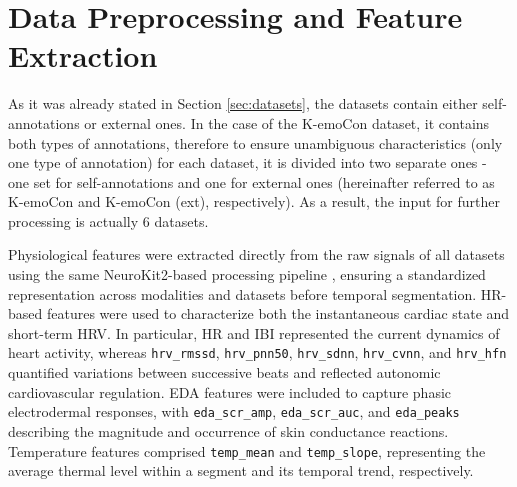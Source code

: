 \documentclass{isd}
\begin{document}
{%




\section{Data Preprocessing and Feature Extraction}
As it was already stated in Section \ref{sec:datasets}, the datasets contain either self-annotations or external ones. In the case of the K-emoCon dataset, it contains both types of annotations, therefore to ensure unambiguous characteristics (only one type of annotation) for each dataset, it is divided into two separate ones - one set for self-annotations and one for external ones (hereinafter referred to as K-emoCon and K-emoCon (ext), respectively). As a result, the input for further processing is actually 6 datasets.

Physiological features were extracted directly from the raw signals of all datasets using the same NeuroKit2-based processing pipeline \cite{makowski2021neurokit}, ensuring a standardized representation across modalities and datasets before temporal segmentation.
HR-based features were used to characterize both the instantaneous cardiac state and short-term HRV. In particular, HR and IBI represented the current dynamics of heart activity, whereas \texttt{hrv\_rmssd}, \texttt{hrv\_pnn50}, \texttt{hrv\_sdnn}, \texttt{hrv\_cvnn}, and \texttt{hrv\_hfn} quantified variations between successive beats and reflected autonomic cardiovascular regulation. EDA features were included to capture phasic electrodermal responses, with \texttt{eda\_scr\_amp}, \texttt{eda\_scr\_auc}, and \texttt{eda\_peaks} describing the magnitude and occurrence of skin conductance reactions. Temperature features comprised \texttt{temp\_mean} and \texttt{temp\_slope}, representing the average thermal level within a segment and its temporal trend, respectively.

}
\end{document}
